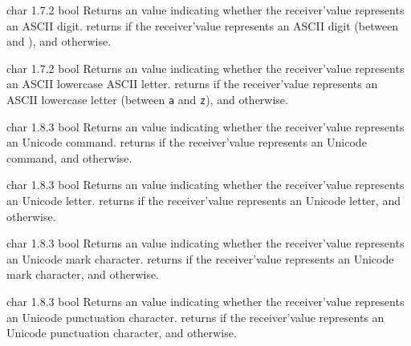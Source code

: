 {char}
{1.7.2}
{bool}
{Returns an  value indicating whether the receiver'value represents an ASCII digit.}
{returns  if the receiver'value represents an ASCII digit (between \texttt{\textquotesingle} and \texttt{\textquotesingle}), and  otherwise.}





{char}
{1.7.2}
{bool}
{Returns an  value indicating whether the receiver'value represents an ASCII lowercase ASCII letter.}
{returns  if the receiver'value represents an ASCII lowercase letter (between \texttt{\textquotesingle a\textquotesingle} and \texttt{\textquotesingle z\textquotesingle}), and  otherwise.}






{char}
{1.8.3}
{bool}
{Returns an  value indicating whether the receiver'value represents an Unicode command.}
{returns  if the receiver'value represents an Unicode command, and  otherwise.}






{char}
{1.8.3}
{bool}
{Returns an  value indicating whether the receiver'value represents an Unicode letter.}
{returns  if the receiver'value represents an Unicode letter, and  otherwise.}






{char}
{1.8.3}
{bool}
{Returns an  value indicating whether the receiver'value represents an Unicode mark character.}
{returns  if the receiver'value represents an Unicode mark character, and  otherwise.}






{char}
{1.8.3}
{bool}
{Returns an  value indicating whether the receiver'value represents an Unicode punctuation character.}
{returns  if the receiver'value represents an Unicode punctuation character, and  otherwise.}






